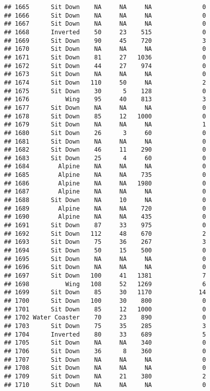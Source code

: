 \documentclass[
]{article}
\begin{document}
\begin{verbatim}
## 1665      Sit Down    NA     NA     NA              0
## 1666      Sit Down    NA     NA     NA              0
## 1667      Sit Down    NA     NA     NA              0
## 1668      Inverted    50     23    515              0
## 1669      Sit Down    90     45    720              3
## 1670      Sit Down    NA     NA     NA              0
## 1671      Sit Down    81     27   1036              0
## 1672      Sit Down    44     27    974              0
## 1673      Sit Down    NA     NA     NA              0
## 1674      Sit Down   110     50     NA              2
## 1675      Sit Down    30      5    128              0
## 1676          Wing    95     40    813              3
## 1677      Sit Down    NA     NA     NA              0
## 1678      Sit Down    85     12   1000              0
## 1679      Sit Down    NA     NA     NA              1
## 1680      Sit Down    26      3     60              0
## 1681      Sit Down    NA     NA     NA              0
## 1682      Sit Down    46     11    290              0
## 1683      Sit Down    25      4     60              0
## 1684        Alpine    NA     NA     NA              0
## 1685        Alpine    NA     NA    735              0
## 1686        Alpine    NA     NA   1980              0
## 1687        Alpine    NA     NA     NA              0
## 1688      Sit Down    NA     10     NA              0
## 1689        Alpine    NA     NA    720              0
## 1690        Alpine    NA     NA    435              0
## 1691      Sit Down    87     33    975              0
## 1692      Sit Down   112     48    670              2
## 1693      Sit Down    75     36    267              3
## 1694      Sit Down    50     15    500              0
## 1695      Sit Down    NA     NA     NA              0
## 1696      Sit Down    NA     NA     NA              0
## 1697      Sit Down   100     41   1381              7
## 1698          Wing   108     52   1269              6
## 1699      Sit Down    85     30   1170             14
## 1700      Sit Down   100     30    800              0
## 1701      Sit Down    85     12   1000              0
## 1702 Water Coaster    70     23    890              0
## 1703      Sit Down    75     35    285              3
## 1704      Inverted    80     33    689              5
## 1705      Sit Down    NA     NA    340              0
## 1706      Sit Down    36      8    360              0
## 1707      Sit Down    NA     NA     NA              0
## 1708      Sit Down    NA     NA     NA              0
## 1709      Sit Down    NA     21    380              2
## 1710      Sit Down    NA     NA     NA              0

\end{verbatim}
\end{document}
